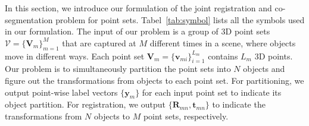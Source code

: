 In this section, we introduce our formulation of the joint registration and co-segmentation problem for point sets. Tabel~\ref{tab:symbol} lists all the symbols used in our formulation. The input of our problem is a group of 3D point sets  $\mathcal{V}=\{\mathbf{V}_m\}^{M}_{m=1}$ that are captured at $M$ different times in a scene, where objects move in different ways. Each point set $\mathbf{V}_m=\{\mathbf{v}_{mi}\}^{L_m}_{i=1}$ contains $L_m$ 3D points. Our problem is to simultaneously partition the point sets into $N$ objects and figure out the transformations from objects to each point set. For partitioning, we output point-wise label vectors $\{\mathbf{y}_m\}$ for each input point set to indicate its object partition. For registration, we output $\{\mathbf{R}_{mn},\mathbf{t}_{mn}\}$ to indicate the transformations from $N$ objects to $M$ point sets, respectively.
